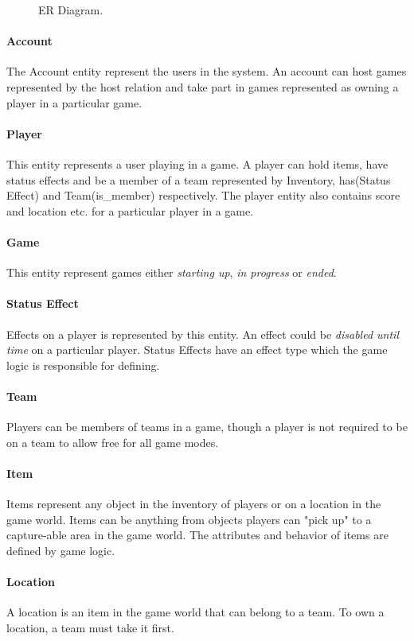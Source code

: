 \begin{figure}
  \centering
    
  \caption{ER Diagram.}
  \label{fig:ER}
\end{figure}




\paragraph{Account}
The Account entity represent the users in the system. An account can host games represented by the host relation and take part in games represented as owning a player in a particular game.

\paragraph{Player}
This entity represents a user playing in a game. A player can hold items, have status effects and be a member of a team represented by Inventory, has(Status Effect) and Team(is\_member) respectively. The player entity also contains score and location etc. for a particular player in a game.

\paragraph{Game}
This entity represent games either \textit{starting up}, \textit{in progress} or \textit{ended}.

\paragraph{Status Effect}
Effects on a player is represented by this entity. An effect could be \textit{disabled until time} on a particular player. Status Effects have an effect type which the game logic is responsible for defining.

\paragraph{Team}
Players can be members of teams in a game, though a player is not required to be on a team to allow free for all game modes.

\paragraph{Item}
Items represent any object in the inventory of players or on a location in the game world. Items can be anything from objects players can "pick up" to a capture-able area in the game world. The attributes and behavior of items are defined by game logic.

\paragraph{Location}
A location is an item in the game world that can belong to a team. To own a location, a team must take it first.





